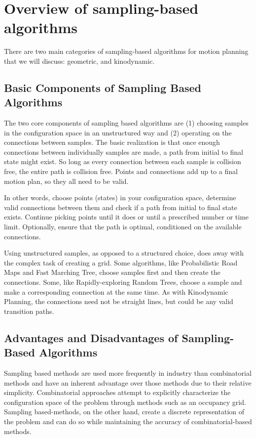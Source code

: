 \documentclass[twoside]{article}
\begin{document}
\section{Overview of sampling-based algorithms} %
There are two main categories of sampling-based algorithms for motion planning that we will discuss: geometric, and kinodynamic.

\subsection{Basic Components of Sampling Based Algorithms} %

The two core components of sampling based algorithms are (1) choosing samples in the configuration space in an unstructured way and (2) operating on the connections between samples. The basic realization is that once enough connections between individually samples are made, a path from initial to final state might exist. So long as every connection between each sample is collision free, the entire path is collision free. Points and connections add up to a final motion plan, so they all need to be valid.

In other words, choose points (states) in your configuration space, determine valid connections between them and check if a path from initial to final state exists. Continue picking points until it does or until a prescribed number or time limit. Optionally, ensure that the path is optimal, conditioned on the available connections.

Using unstructured samples, as opposed to a structured choice, does away with the complex task of creating a grid. Some algorithms, like Probabilistic Road Maps and Fast Marching Tree, choose samples first and then create the connections. Some, like Rapidly-exploring Random Trees, choose a sample and make a corresponding connection at the same time. As with Kinodynamic Planning, the connections need not be straight lines, but could be any valid transition paths.

\subsection{Advantages and Disadvantages of Sampling-Based Algorithms} %
Sampling based methods are used more frequently in industry than combinatorial methods and have an inherent advantage over those methods due to their relative simplicity. Combinatorial approaches attempt to explicitly characterize the configuration space of the problem through methods such as an occupancy grid. Sampling based-methods, on the other hand, create a discrete representation of the problem and can do so while maintaining the accuracy of combinatorial-based methods.
\end{document}
